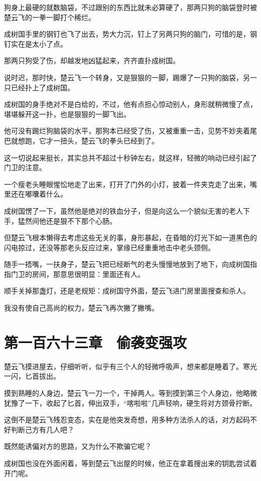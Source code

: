 狗身上最硬的就数脑袋，不过跟别的东西比就未必算硬了，那两只狗的脑袋登时被楚云飞的一拳一脚打个稀烂。

成树国手里的钢钉也飞了出去，势大力沉，钉上了另两只狗的脑门，可惜的是，钢钉实在是太小了点。

那两只狗受了伤，却越发地凶猛起来，齐齐直扑成树国。

说时迟，那时快，楚云飞一个转身，又是狠狠的一脚，踢爆了一只狗的脑袋，另一只已经扑上了成树国。

成树国的身手绝对不是白给的，不过，他有点担心惊动别人，身形就稍微慢了点，堪堪躲开这一扑，也是狠狠的一脚飞出。

他可没有踢烂狗脑袋的水平，那狗本已经受了伤，又被重重一击，见势不妙夹着尾巴就想跑，它才一扭头，楚云飞的拳头已经到了。

这一切说起来挺长，其实总共不超过十秒钟左右，就这样，轻微的响动已经引起了门卫的注意。

一个瘦老头睡眼惺忪地走了出来，打开了门外的小灯，披着一件夹克走了出来，嘴里还在嘟囔着什么。

成树国愣了一下，虽然他是绝对的铁血分子，但是向这么一个貌似无害的老人下手，猛然间他还是狠不下那个心肠。

但楚云飞根本懒得去考虑这些无关的事，身形暴起，在昏暗的灯光下如一道黑色的闪电掠过，还没等那老头反应过来，掌缘已经重重地击中老头颈侧。

随手一捂嘴，一扶身子，楚云飞把已经断气的老头慢慢地放到了地下，向成树国指指门卫的房间，那意思很明显：里面还有人。

顺手关掉那盏灯，还是老规矩：成树国守外面，楚云飞进门房里面搜查和杀人。

我没有使自己高尚的权力，楚云飞再次撇了撇嘴。

\section{第一百六十三章　偷袭变强攻}

楚云飞摸进屋去，仔细听听，似乎有三个人的轻微呼吸声，想来都是睡着了。寒光一闪，匕首拔出。

摸到熟睡的人身边，楚云飞一刀一个，干掉两人。等到摸到第三个人身边，他略微犹豫了一下，收起了匕首，伸出双手，“喀啦啦”几声轻响，硬生将对方颈骨拧断。

这倒不是楚云飞残忍变态，实在是他突发奇想，用多种方法杀人的话，对方起码不好判断己方有几人吧？

既然能诱偏对方的思路，又为什么不欺骗它呢？

成树国也没在外面闲着，等到楚云飞出屋的时候，他正在拿着搜出来的钥匙尝试着开门呢。

